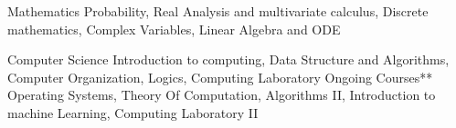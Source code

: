 

\begin{cvskills}






  \cvskill
    {Mathematics} %
    {Probability, Real Analysis and multivariate calculus, Discrete mathematics, Complex Variables, Linear Algebra and ODE} %

  \cvskill
    {Computer Science} %
    {Introduction to computing, Data Structure and Algorithms, Computer Organization, Logics, Computing Laboratory} %
  \cvskill
    {Ongoing Courses**} %
    {Operating Systems, Theory Of Computation, Algorithms II, Introduction to machine Learning, Computing Laboratory II} %


\end{cvskills}